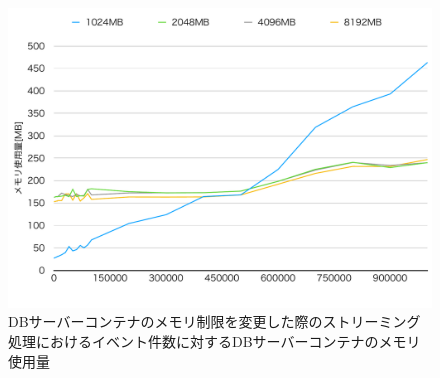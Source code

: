 \documentclass[../../../../../main]{subfiles}
\begin{document}
    \begin{figure}[H]
        \centering
        \includegraphics[width=12cm]{graph}
        \caption{DBサーバーコンテナのメモリ制限を変更した際のストリーミング処理におけるイベント件数に対するDBサーバーコンテナのメモリ使用量}
        \label{fig:stream-change-db-memory-limit-db-memory-app_4_8192-db_400}
    \end{figure}
\end{document}
